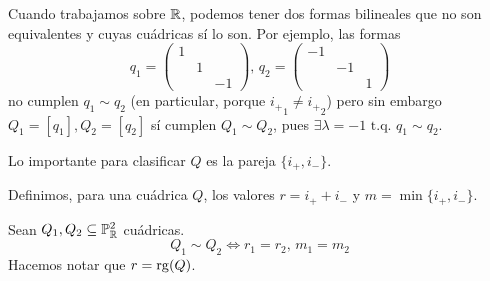 \begin{obs}
  Cuando trabajamos sobre $\mathbb{R}$, podemos tener dos formas bilineales que no son 
  equivalentes y cuyas cuádricas sí lo son. Por ejemplo, las formas
  \[q_1 = \begin{pmatrix} 1 & & \\ & 1 & \\ & & -1 \end{pmatrix}, \, q_2 = 
  \begin{pmatrix} -1 & & \\ & -1 & \\ & & 1 \end{pmatrix}\]
  no cumplen $q_1 \sim q_2$ (en particular, porque ${i_{+}}_1 \neq {i_{+}}_2$) pero sin 
  embargo $Q_1 = [q_1], Q_2 = [q_2]$ sí cumplen $Q_1 \sim Q_2$, pues $\exists \lambda = -1
  \text{ t.q. } q_1 \sim q_2$.

  Lo importante para clasificar $Q$ es la pareja $\{i_+, i_-\}$.
\end{obs}
\begin{defi}
  Definimos, para una cuádrica $Q$, los valores $r = i_+ + i_-$ y $m = \min \{i_+, i_-\}$. 
\end{defi}
\begin{prop}
  Sean $Q_1, Q_2 \subseteq \mathbb{P}^2_{\mathbb{R}}$ cuádricas.
  \[Q_1 \sim Q_2 \iff r_1 = r_2, \, m_1 = m_2\]
  Hacemos notar que $r = \operatorname{rg}(Q)$.
\end{prop}


